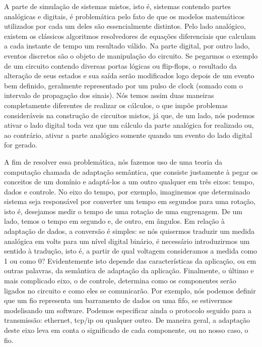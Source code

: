 \documentclass{article}
\begin{document}
A parte de simulação de sistemas mistos, isto é, sistemas contendo partes
analógicas e digitais, é problemática pelo fato de que os modelos matemáticos
utilizados por cada um deles são essencialmente distintos. Pelo lado analógico,
existem os clássicos algoritmos resolvedores de equações diferenciais que
calculam a cada instante de tempo um resultado válido. Na parte digital, por
outro lado, eventos discretos são o objeto de manipulação do circuito. Se
pegarmos o exemplo de um circuito contendo diversas portas lógicas ou
flip-flops, o resultado da alteração de seus estados e sua saída serão
modificados logo depois de um evento bem definido, geralmente representado por
um pulso de clock (somado com o intervalo de propagação dos sinais).
Nós temos assim duas maneiras completamente diferentes de realizar os cálculos,
o que impõe problemas consideráveis na construção de circuitos mistos, já que,
de um lado, nós podemos ativar o lado digital toda vez que um cálculo da parte
analógica for realizado ou, ao contrário, ativar a parte analógico somente
quando um evento do lado digital for gerado.

\vspace{12pt}

A fim de resolver essa problemática, nós fazemos uso de uma teoria da computação
chamada de adaptação semântica, que consiste justamente à pegar os conceitos de
um domínio e adaptá-los a um outro qualquer em três eixos: tempo, dados e
controle. No eixo do tempo, por exemplo, imaginemos que determinado sistema seja
responsável por converter um tempo em segundos para uma rotação, isto é,
desejamos medir o tempo de uma rotação de uma engrenagem. De um lado, temos o
tempo em segundo e, de outro, em ângulos. Em relação à adaptação de dados, a
conversão é simples: se nós quisermos traduzir um medida analógica em volts para
um nível digital binário, é necessário introduzirmos um sentido à tradução, isto
é, a partir de qual voltagem consideramos a medida como 1 ou como 0?
Evidentemente isto depende das características da aplicação, ou em outras
palavras, da semântica de adaptação da aplicação. Finalmente, o último e mais
complicado eixo, o de controle, determina como os componentes serão ligados no
circuito e como eles se comunicarão. Por exemplo, nós podemos definir que um fio
representa um barramento de dados ou uma fifo, se estivermos modelisando um
software. Podemos especificar ainda o protocolo seguido para a transmissão:
ethernet, tcp/ip ou qualquer outro. De maneira geral, a adaptação deste eixo
leva em conta o significado de cada componente, ou no nosso caso, o fio.
\end{document}
